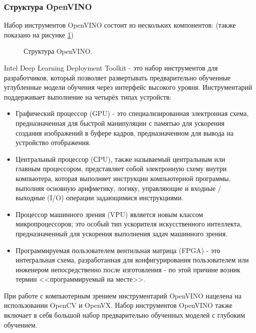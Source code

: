 \documentclass[12pt,a4paper]{scrartcl}
\begin{document}
		\subsubsection{Структура OpenVINO}
		
			Набор инструментов OpenVINO состоит из нескольких компонентов: (также показано на рисунке \ref{fig:OpenVINO_Structure})
			
			\begin{figure}[h]
				\caption{Структура OpenVINO.}
				\label{fig:OpenVINO_Structure}
			\end{figure}
			
			Intel Deep Learning Deployment Toolkit - это набор инструментов для разработчиков, который позволяет развертывать предварительно обученные углубленные	модели обучения через интерфейс высокого уровня. Инструментарий поддерживает выполнение на четырёх типах устройств:
			
			\begin{itemize}
				\item Графический процессор (GPU) - это специализированная электронная схема, предназначенная для быстрой манипуляции с памятью для ускорения создания изображений в буфере кадров, предназначенном для вывода на устройство отображения\cite{bib:GPU}.
				\item Центральный процессор (СPU), также называемый центральным или главным процессором, представляет собой электронную схему внутри	компьютера, которая выполняет инструкции компьютерной программы, выполняя основную арифметику, логику, управляющие и входные / выходные (I/O) операции задающимися инструкциями\cite{bib:CPU}.
				\item Процессор машинного зрения (VPU) является новым классом микропроцессоров; это особый тип ускорителя искусственного интеллекта, предназначенный для ускорения выполнения задач машинного зрения\cite{bib:VPU}.
				\item Программируемая пользователем вентильная матрица (FPGA) - это интегральная схема, разработанная для конфигурирования пользователем или	инженером непосредственно после изготовления - по этой причине возник термин <<программируемый на месте>>\cite{bib:FPGA}.
			\end{itemize} 
		
			При работе с компьютерным зрением инструментарий OpenVINO нацелена на использовании OpenCV и OpenVX. Набор инструментов OpenVINO также включает в себя большой набор предварительно обученных моделей с глубоким обучением. 
			
\end{document}
